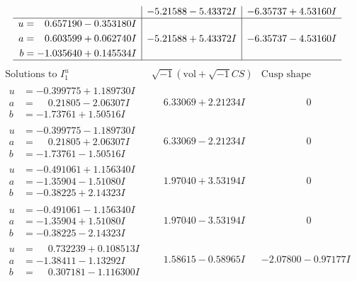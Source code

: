 \documentclass[1p]{elsarticle_modified}
\theoremstyle{definition}
\newcommand{\I}{\sqrt{-1}}
\begin{document}
$$\begin{array}{c|c|c}
 & -5.21588 - 5.43372 I & -6.35737 + 4.53160 I \\ \hline\begin{aligned}
u &= \phantom{-}0.657190 - 0.353180 I \\
a &= \phantom{-}0.603599 + 0.062740 I \\
b &= -1.035640 + 0.145534 I\end{aligned}
 & -5.21588 + 5.43372 I & -6.35737 - 4.53160 I\\
 \hline 
 \end{array}$$\newpage$$\begin{array}{c|c|c}  
\text{Solutions to }I^u_{1}& \I (\text{vol} + \sqrt{-1}CS) & \text{Cusp shape}\\
 \hline 
\begin{aligned}
u &= -0.399775 + 1.189730 I \\
a &= \phantom{-}0.21805 - 2.06307 I \\
b &= -1.73761 + 1.50516 I\end{aligned}
 & \phantom{-}6.33069 + 2.21234 I & \phantom{-0.000000 } 0 \\ \hline\begin{aligned}
u &= -0.399775 - 1.189730 I \\
a &= \phantom{-}0.21805 + 2.06307 I \\
b &= -1.73761 - 1.50516 I\end{aligned}
 & \phantom{-}6.33069 - 2.21234 I & \phantom{-0.000000 } 0 \\ \hline\begin{aligned}
u &= -0.491061 + 1.156340 I \\
a &= -1.35904 - 1.51080 I \\
b &= -0.38225 + 2.14323 I\end{aligned}
 & \phantom{-}1.97040 + 3.53194 I & \phantom{-0.000000 } 0 \\ \hline\begin{aligned}
u &= -0.491061 - 1.156340 I \\
a &= -1.35904 + 1.51080 I \\
b &= -0.38225 - 2.14323 I\end{aligned}
 & \phantom{-}1.97040 - 3.53194 I & \phantom{-0.000000 } 0 \\ \hline\begin{aligned}
u &= \phantom{-}0.732239 + 0.108513 I \\
a &= -1.38411 - 1.13292 I \\
b &= \phantom{-}0.307181 - 1.116300 I\end{aligned}
 & \phantom{-}1.58615 - 0.58965 I & -2.07800 - 0.97177 I \\ \hline\begin{aligned}

\end{aligned}
\end{array}$$
\end{document}

